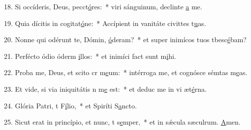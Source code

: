 18. Si occíderis, Deus, pecct\uline{ó}res:~* viri sánguinum, declinte \uline{a} me.\par 
19. Quia dícitis in cogitat\uline{ó}ne:~* Accípient in vanitáte civittes t\uline{u}as.\par 
20. Nonne qui odérunt te, Dómin, \uline{ó}deram?~* et super inimícos tuos tbesc\uline{é}bam?\par 
21. Perfécto ódio óderm \uline{i}llos:~* et inimíci fact sunt m\uline{i}hi.\par 
22. Proba me, Deus, et scito cr m\uline{e}um:~* intérroga me, et cognósce sémtas m\uline{e}as.\par 
23. Et vide, si via iniquitátis n m\uline{e} est:~* et deduc me in vi æt\uline{é}rna.\par 
24. Glória Patri, t F\uline{í}lio,~* et Spiríti S\uline{a}ncto.\par 
25. Sicut erat in princípio, et nunc, t s\uline{e}mper,~* et in sǽcula sæculrum. \uline{A}men.\par 
